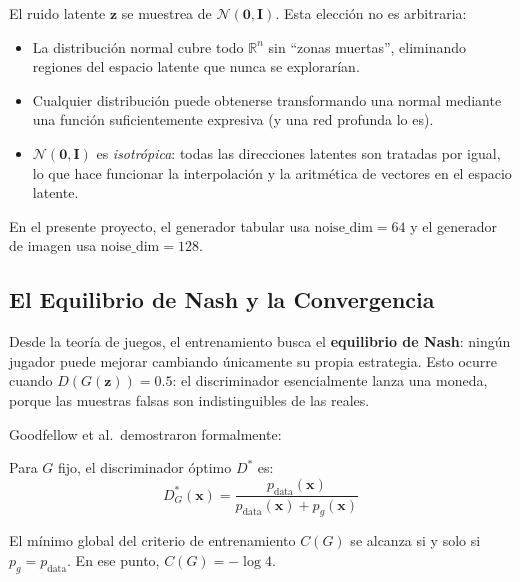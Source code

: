 \documentclass[a4paper,11pt]{article}
\begin{document}
El ruido latente $\bm{z}$ se muestrea de $\mathcal{N}(\bm{0},\bm{I})$.
Esta elección no es arbitraria:

\begin{itemize}
    \item La distribución normal cubre todo $\mathbb{R}^n$ sin ``zonas muertas'',
          eliminando regiones del espacio latente que nunca se explorarían.
    \item Cualquier distribución puede obtenerse transformando una normal
          mediante una función suficientemente expresiva (y una red profunda
          lo es).
    \item $\mathcal{N}(\bm{0},\bm{I})$ es \emph{isotrópica}: todas las
          direcciones latentes son tratadas por igual, lo que hace funcionar
          la interpolación y la aritmética de vectores en el espacio latente.
\end{itemize}

En el presente proyecto, el generador tabular usa $\text{noise\_dim}=64$ y
el generador de imagen usa $\text{noise\_dim}=128$.

\subsection{El Equilibrio de Nash y la Convergencia}

Desde la teoría de juegos, el entrenamiento busca el \textbf{equilibrio de Nash}:
ningún jugador puede mejorar cambiando únicamente su propia estrategia.
Esto ocurre cuando $D(G(\bm{z}))=0.5$: el discriminador esencialmente lanza
una moneda, porque las muestras falsas son indistinguibles de las reales.

Goodfellow et al.\ demostraron formalmente:

\begin{tcolorbox}[colback=blue!5!white, colframe=blue!50!black, title=Proposición 1 (Discriminador Óptimo)]
Para $G$ fijo, el discriminador óptimo $D^*$ es:
\begin{equation}
    \label{eq:dstar}
    D^*_G(\bm{x}) = \frac{p_{\text{data}}(\bm{x})}{p_{\text{data}}(\bm{x}) + p_g(\bm{x})}
\end{equation}
\end{tcolorbox}

\begin{tcolorbox}[colback=green!5!white, colframe=green!50!black, title=Teorema 1 (Óptimo Global)]
El mínimo global del criterio de entrenamiento $C(G)$ se alcanza si y solo si
$p_g = p_{\text{data}}$. En ese punto, $C(G) = -\log 4$.
\end{tcolorbox}
\end{document}
